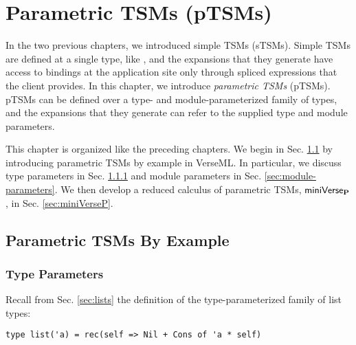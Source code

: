 
\chapter{Parametric TSMs (pTSMs)}\label{chap:ptsms}
In the two previous chapters, we introduced simple TSMs (sTSMs). Simple TSMs are defined at a single type, like , and the expansions that they generate have access to bindings at the application site only through spliced expressions that the client provides. In this chapter, we introduce \emph{parametric TSMs} (pTSMs). pTSMs can be defined over a type- and module-parameterized family of types, and the expansions that they generate can refer to the supplied type and module parameters. 

This chapter is organized like the preceding chapters. We begin in Sec. \ref{sec:parameterized-tsms-by-example} by introducing parametric TSMs by example in VerseML. In particular, we discuss type parameters in Sec. \ref{sec:type-parameters} and module parameters in Sec. \ref{sec:module-parameters}. We then develop a reduced calculus of parametric TSMs, $\mathsf{miniVerse}_\textbf{P}$, in Sec. \ref{sec:miniVerseP}.
\section{Parametric TSMs By Example}\label{sec:parameterized-tsms-by-example}

\subsection{Type Parameters}\label{sec:type-parameters}
Recall from Sec. \ref{sec:lists} the definition of the type-parameterized family of list types:
\begin{lstlisting}[numbers=none]
type list('a) = rec(self => Nil + Cons of 'a * self)
\end{lstlisting}



